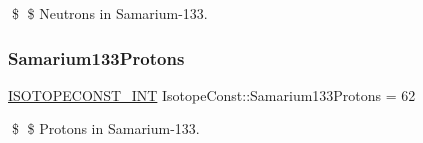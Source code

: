 \$ \$ Neutrons in Samarium-\/133. \mbox{\label{group___isotope_const-_samarium-_sm133_ga7deb91e73b5edd96ccbf644992056426}} 
\subsubsection{\texorpdfstring{Samarium133\+Protons}{Samarium133Protons}}
{\footnotesize\ttfamily \mbox{\hyperlink{group___isotope_const-_macros_ga5f18360b3e99483a35c32d789e62621c}{I\+S\+O\+T\+O\+P\+E\+C\+O\+N\+S\+T\+\_\+\+I\+NT}} Isotope\+Const\+::\+Samarium133\+Protons = 62}

\$ \$ Protons in Samarium-\/133. 